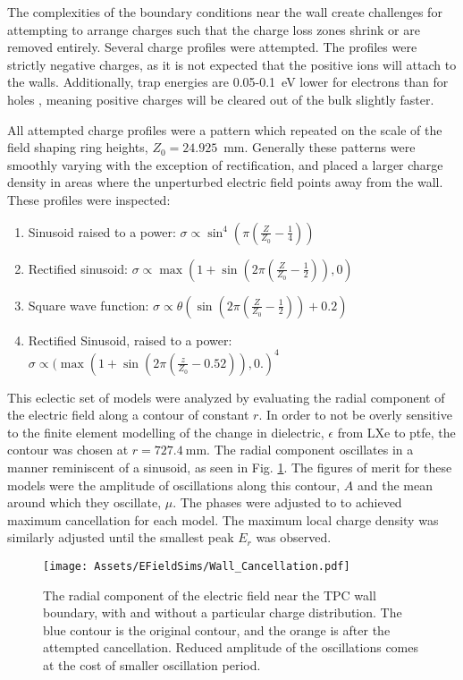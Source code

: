 The complexities of the boundary conditions near the wall create challenges for attempting to arrange charges such that the charge loss zones shrink or are removed entirely.
Several charge profiles were attempted. 
The profiles were strictly negative charges, as it is not expected that the positive ions will attach to the walls.
Additionally, trap energies are 0.05-0.1~eV lower for electrons than for holes \cite{zhang_surface_2006}, meaning positive charges will be cleared out of the bulk slightly faster.

All attempted charge profiles were a pattern which repeated on the scale of the field shaping ring heights, $Z_0 = 24.925$~mm.
Generally these patterns were smoothly varying with the exception of rectification, and placed a larger charge density in areas where the unperturbed electric field  points away from the wall.
These profiles were inspected:
\begin{enumerate}
    \item Sinusoid raised to a power: $\sigma \propto \sin^4(\pi(\frac{Z}{Z_0} -\frac{1}{4} ))$
    \item Rectified sinusoid: $\sigma \propto \max(1+\sin(2 \pi (\frac{Z}{Z_0} -\frac{1}{2} )),0)$
    \item Square wave function: $\sigma \propto \theta(\sin(2 \pi (\frac{Z}{Z_0} - \frac{1}{2}))+0.2)$
    \item Rectified Sinusoid, raised to a power: $\sigma \propto (\max(1+\sin(2 \pi (\frac{z}{Z_0} -0.52 )),0.)^4 $
\end{enumerate}

This eclectic set of  models were analyzed by evaluating the radial component of the electric field along a contour of constant $r$.
In order to not be overly sensitive to the finite element modelling of the change in dielectric, $\epsilon$ from LXe to ptfe, the contour was chosen at $r=727.4\mathrm{~mm}$.
The radial component oscillates in a manner reminiscent of a sinusoid, as seen in Fig. \ref{fig:cancellation}.
The figures of merit for these models were the amplitude of oscillations along this contour, $A$ and the mean around which they oscillate, $\mu$.
The phases were adjusted to to achieved maximum cancellation for each model.
The maximum local charge density was similarly adjusted until the smallest peak $E_r$ was observed.


\begin{figure}
    \centering
    \texttt{[image: Assets/EFieldSims/Wall\_Cancellation.pdf]}
    \caption[The radial component of the electric field near the TPC wall boundary, with and without a particular charge distribution.]%
    { The radial component of the electric field near the TPC wall boundary, with and without a particular charge distribution.
    The blue contour is the original contour, and the orange is after the attempted cancellation.
    Reduced amplitude of the oscillations comes at the cost of smaller oscillation period.}
    \label{fig:cancellation}
\end{figure}


